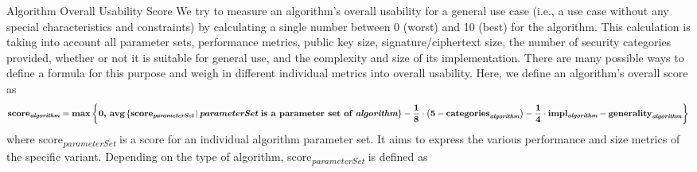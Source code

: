 


\vspace{-5mm}
\begin{algorithmbox}{Algorithm Overall Usability Score}
	\tiny
	We try to measure an algorithm's overall usability for a general use case (i.e., a use case without any special characteristics and constraints) by calculating a single number between 0 (worst) and 10 (best) for the algorithm. This calculation is taking into account all parameter sets, performance metrics, public key size, signature/ciphertext size, the number of security categories provided, whether or not it is suitable for general use, and the complexity and size of its implementation. There are many possible ways to define a formula for this purpose and weigh in different individual metrics into overall usability. Here, we define an algorithm's overall score as
	\begin{align*}
		\textnormal{\bfseries score\textsubscript{\itshape \bfseries algorithm}} = \textnormal{\bfseries max}\left\{\textnormal{\bfseries 0, }\textnormal{\bfseries avg}\left\{\textnormal{\bfseries score}_\textnormal{\itshape \bfseries parameterSet}\,|\, \textnormal{{\itshape\bfseries  parameterSet} \bfseries is a parameter set of {\itshape algorithm}}\right\} - \frac{\textnormal{\bfseries 1}}{\textnormal{\bfseries 8}}\cdot\left(\textnormal{\bfseries 5}-\textnormal{\bfseries categories}_\textnormal{\itshape\bfseries  algorithm}\right) - \frac{\textnormal{\bfseries 1}}{\textnormal{\bfseries 4}}\cdot\textnormal{\bfseries impl\textsubscript{\itshape\bfseries algorithm}}- \textnormal{\bfseries generality}_\textnormal{\itshape\bfseries  algorithm}\right\}
	\end{align*}
	where \textnormal{score\textsubscript{\itshape parameterSet}} is a score for an individual algorithm parameter set. It aims to express the various performance and size metrics of the specific variant. Depending on the type of algorithm, \textnormal{score\textsubscript{\itshape parameterSet}} is defined as

\end{algorithmbox}
